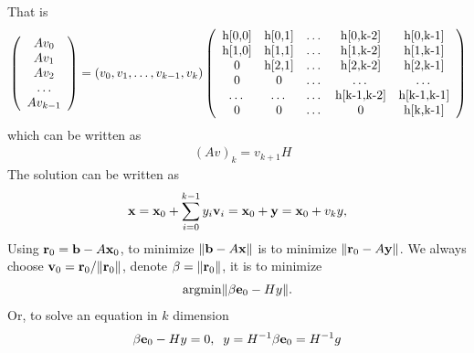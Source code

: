 That is
\begin{equation}
\begin{split}
&\left(\begin{array}{c}Av_0 \\ Av_1 \\ Av_2 \\ \ldots \\ Av_{k-1}\end{array}\right)=\left(v_0,v_1,\ldots,v_{k-1},v_k\right)\left(\begin{array}{ccccc}
$h[0,0]$ & $h[0,1]$ & $\ldots$ & $h[0,k-2]$ & $h[0,k-1]$ \\
$h[1,0]$ & $h[1,1]$ & $\ldots$ & $h[1,k-2]$ & $h[1,k-1]$ \\
$0$ & $h[2,1]$ & $\ldots$ & $h[2,k-2]$ & $h[2,k-1]$ \\
$0$ & $0$ & $\ldots$ & $\ldots$ & $\ldots$ \\
$\ldots$ & $\ldots$ & $\ldots$ & $h[k-1,k-2]$ & $h[k-1,k-1]$ \\
$0$ & $0$ & $\ldots$ & $0$ & $h[k,k-1]$ \\
\end{array}\right)\\
\end{split}
\end{equation}
which can be written as
\begin{equation}
\begin{split}
&(Av)_k=v_{k+1}H
\end{split}
\label{eq,gemres.1}
\end{equation}
The solution can be written as
\begin{equation}
\begin{split}
&{\bf x}={\bf x}_0 + \sum _{i=0}^{k-1} y_i {\bf v}_i={\bf x}_0+{\bf y}={\bf x}_0+v_ky,\\
\end{split}
\end{equation}
Using ${\bf r}_0={\bf b}-A{\bf x}_0$, to minimize $\|{\bf b}-A{\bf x}\|$ is to minimize $\|{\bf r}_0-A{\bf y}\|$. We always choose ${\bf v}_0={\bf r}_0/\|{\bf r}_0\|$, denote $\beta = \|{\bf r}_0\|$, it is to minimize
\begin{equation}
\begin{split}
&{\rm argmin}\|\beta {\bf e}_0 - Hy\|.\\
\end{split}
\end{equation}
Or, to solve an equation in $k$ dimension
\begin{equation}
\begin{split}
&\beta {\bf e}_0 - Hy=0,\;\;y=H^{-1}\beta {\bf e}_0=H^{-1} g\\
\end{split}
\end{equation}

